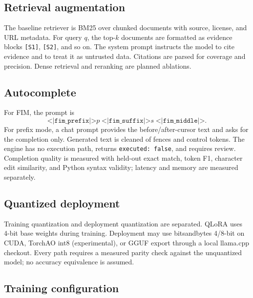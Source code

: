 \subsection{Retrieval augmentation}

The baseline retriever is BM25 over chunked documents with source, license, and
URL metadata. For query $q$, the top-$k$ documents are formatted as evidence
blocks \texttt{[S1]}, \texttt{[S2]}, and so on. The system prompt instructs the
model to cite evidence and to treat it as untrusted data. Citations are parsed
for coverage and precision. Dense retrieval and reranking are planned ablations.

\subsection{Autocomplete}

For FIM, the prompt is
\begin{equation}
\texttt{<|fim\_prefix|>}p\;\texttt{<|fim\_suffix|>}s\;\texttt{<|fim\_middle|>}.
\end{equation}
For prefix mode, a chat prompt provides the before/after-cursor text and asks for
the completion only. Generated text is cleaned of fences and control tokens.
The engine has no execution path, returns \texttt{executed: false}, and requires
review. Completion quality is measured with held-out exact match, token F1,
character edit similarity, and Python syntax validity; latency and memory are
measured separately.

\subsection{Quantized deployment}

Training quantization and deployment quantization are separated. QLoRA uses
4-bit base weights during training. Deployment may use bitsandbytes 4/8-bit on
CUDA, TorchAO int8 (experimental), or GGUF export through a local llama.cpp
checkout. Every path requires a measured parity check against the unquantized
model; no accuracy equivalence is assumed.

\subsection{Training configuration}

